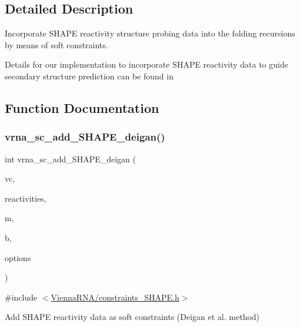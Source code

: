 \subsection{Detailed Description}
Incorporate S\+H\+A\+PE reactivity structure probing data into the folding recursions by means of soft constraints. 

Details for our implementation to incorporate S\+H\+A\+PE reactivity data to guide secondary structure prediction can be found in \cite{lorenz:2016a} 

\subsection{Function Documentation}
\mbox{\label{group__SHAPE__reactivities_ga57d612b58e1c61dd6cfcb5a843f8f1b3}} 
\subsubsection{\texorpdfstring{vrna\+\_\+sc\+\_\+add\+\_\+\+S\+H\+A\+P\+E\+\_\+deigan()}{vrna\_sc\_add\_SHAPE\_deigan()}}
{\footnotesize\ttfamily int vrna\+\_\+sc\+\_\+add\+\_\+\+S\+H\+A\+P\+E\+\_\+deigan (\begin{DoxyParamCaption}\item[{\mbox{\hyperlink{group__fold__compound_ga1b0cef17fd40466cef5968eaeeff6166}{vrna\+\_\+fold\+\_\+compound\+\_\+t}} $\ast$}]{vc,  }\item[{const double $\ast$}]{reactivities,  }\item[{double}]{m,  }\item[{double}]{b,  }\item[{unsigned int}]{options }\end{DoxyParamCaption})}



{\ttfamily \#include $<$\mbox{\hyperlink{constraints__SHAPE_8h}{Vienna\+R\+N\+A/constraints\+\_\+\+S\+H\+A\+P\+E.\+h}}$>$}



Add S\+H\+A\+PE reactivity data as soft constraints (Deigan et al. method) 

